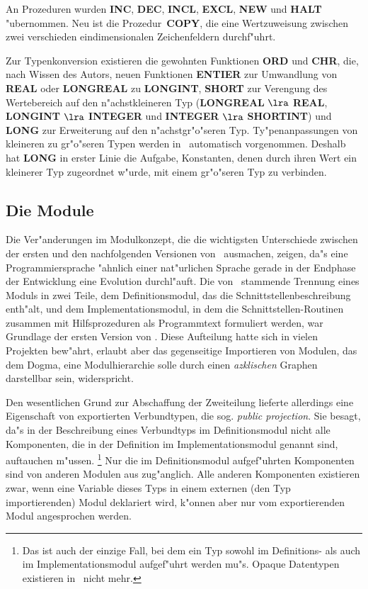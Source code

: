 \medskip
An Prozeduren wurden {\bf INC}, {\bf DEC}, {\bf INCL}, {\bf EXCL},
{\bf NEW} und {\bf HALT} "ubernommen.
Neu ist die Prozedur~{\bf COPY}, die eine Wertzuweisung zwischen
zwei verschieden eindimensionalen Zeichenfeldern durchf"uhrt.

Zur Typenkonversion existieren die gewohnten Funktionen {\bf ORD} und
{\bf CHR}, die, nach Wissen des Autors, neuen Funktionen {\bf ENTIER}
zur Umwandlung von {\bf REAL} oder {\bf LONGREAL} zu {\bf LONGINT},
{\bf SHORT} zur Verengung des Wertebereich auf den n"achstkleineren Typ
({\bf LONGREAL} $\lra$ {\bf REAL}, {\bf LONGINT} $\lra$ {\bf INTEGER} und
{\bf INTEGER} $\lra$ {\bf SHORTINT}) und {\bf LONG} zur Erweiterung auf
den n"achstgr"o"seren Typ.
Ty"penanpassungen von kleineren zu gr"o"seren Typen werden in \oberon\
automatisch vorgenommen.
Deshalb hat {\bf LONG} in erster Linie die Aufgabe, Konstanten, denen
durch ihren Wert ein kleinerer Typ zugeordnet w"urde, mit einem
gr"o"seren Typ zu verbinden.

\subsection{Die Module}

Die Ver"anderungen im Modulkonzept, die die wichtigsten Unterschiede
zwischen der ersten und den nachfolgenden Versionen von \oberon\ ausmachen,
zeigen, da"s eine Programmiersprache "ahnlich einer nat"urlichen Sprache
gerade in der Endphase der Entwicklung eine Evolution durchl"auft.
Die von \modula\ stammende Trennung eines Moduls in zwei Teile, dem
Definitionsmodul, das die Schnittstellenbeschreibung enth"alt, und dem
Implementationsmodul, in dem die Schnittstellen-Routinen zusammen mit
Hilfsprozeduren als Programmtext formuliert werden, war Grundlage der
ersten Version von \oberon \cite{oberon0}.
Diese Aufteilung hatte sich in vielen Projekten bew"ahrt, erlaubt
aber das gegenseitige Importieren von Modulen, das dem Dogma,
eine Modulhierarchie solle durch einen {\em azklischen\/} Graphen darstellbar
sein, widerspricht.

Den wesentlichen Grund zur Abschaffung der Zweiteilung lieferte allerdings
eine Eigenschaft von exportierten Verbundtypen, die sog. {\it public projection\/}.
Sie besagt, da"s in der Beschreibung eines Verbundtyps im Definitionsmodul
nicht alle Komponenten, die in der Definition im Implementationsmodul genannt
sind, auftauchen m"ussen.%
\footnote{Das ist auch der einzige Fall, bei dem ein Typ sowohl im
Definitions- als auch im Implementationsmodul aufgef"uhrt werden mu"s.
Opaque Datentypen existieren in \oberon\ nicht mehr.}
Nur die im Definitionsmodul aufgef"uhrten Komponenten sind von anderen
Modulen aus zug"anglich.
Alle anderen Komponenten existieren zwar, wenn eine Variable dieses Typs
in einem externen (den Typ importierenden) Modul deklariert wird, k"onnen
aber nur vom exportierenden Modul angesprochen werden.


